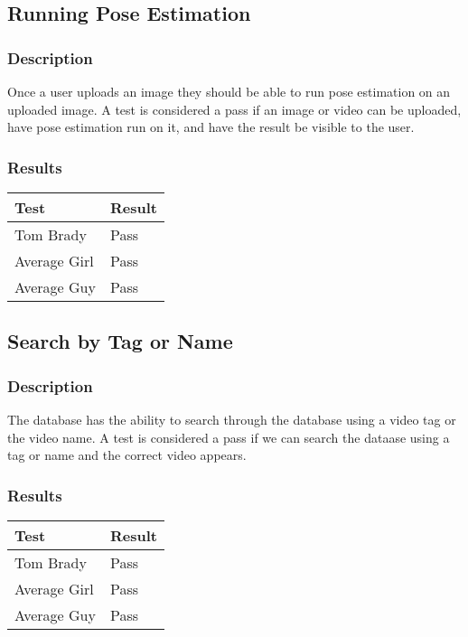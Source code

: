 \documentclass{scrreprt}
\begin{document}
\subsection{Running Pose Estimation}
\subsubsection{Description}

Once a user uploads an image they should be able to run pose estimation on an
uploaded image. A test is considered a pass if an image or video can be
uploaded, have pose estimation run on it, and have the result be visible to the
user.

\subsubsection{Results}
 \centering
 \begin{tabular}{||p{2.5cm}|p{2.5cm}||}
 \hline
 \bf Test & \bf Result\\
 \hline\hline
  Tom Brady & Pass  \\
   \hline\hline
  Average Girl & Pass  \\
   \hline\hline
  Average Guy & Pass  \\
\hline

 \hline
 \end{tabular}

\subsection{Search by Tag or Name}
\subsubsection{Description}

The database has the ability to search through the database using a video tag
or the video name. A test is considered a pass if we can search the dataase
using a tag or name and the correct video appears.

\subsubsection{Results}
 \centering
 \begin{tabular}{||p{2.5cm}|p{2.5cm}||}
 \hline
 \bf Test & \bf Result\\
 \hline\hline
  Tom Brady & Pass  \\
   \hline\hline
  Average Girl & Pass  \\
   \hline\hline
  Average Guy & Pass  \\
\hline

 \hline
 \end{tabular}
\end{document}
